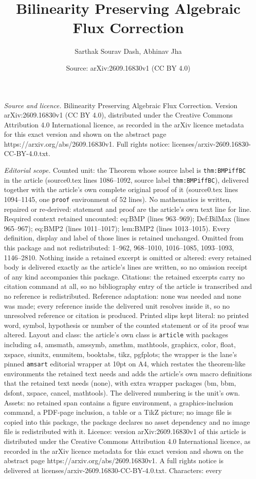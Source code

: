 \documentclass[10pt,a4paper]{amsart}
\title[Bilinearity Preserving Algebraic Flux Correction]{Bilinearity Preserving Algebraic Flux Correction}
\author{Sarthak Sourav Dash, Abhinav Jha}
\date{Source: arXiv:2609.16830v1 (CC BY 4.0)}
\begin{document}
\maketitle

\noindent\emph{Source and licence.} Bilinearity Preserving Algebraic Flux Correction. Version arXiv:2609.16830v1 (CC BY 4.0), distributed under the Creative Commons Attribution 4.0 International licence, as recorded in the arXiv licence metadata for this exact version and shown on the abstract page https://arxiv.org/abs/2609.16830v1. Full rights notice: licenses/arxiv-2609.16830-CC-BY-4.0.txt.\par\smallskip

\noindent\textit{Editorial scope.} Counted unit: the Theorem whose source label is \texttt{thm:BMPiffBC} in the article (source0.tex lines 1086--1092, source label \texttt{thm:BMPiffBC}), delivered together with the article's own complete original proof of it (source0.tex lines 1094--1145, one \texttt{proof} environment of 52 lines). No mathematics is written, repaired or re-derived: statement and proof are the article's own text line for line. Required context retained uncounted: eq:BMP (lines 963--969); Def:BilMax (lines 965--967); eq:BMP2 (lines 1011--1017); lem:BMP2 (lines 1013--1015). Every definition, display and label of those lines is retained unchanged. Omitted from this package and not redistributed: 1--962, 968--1010, 1016--1085, 1093--1093, 1146--2810. Nothing inside a retained excerpt is omitted or altered: every retained body is delivered exactly as the article's lines are written, so no omission receipt of any kind accompanies this package. Citations: the retained excerpts carry no citation command at all, so no bibliography entry of the article is transcribed and no reference is redistributed. Reference adaptation: none was needed and none was made; every reference inside the delivered unit resolves inside it, so no unresolved reference or citation is produced. Printed slips kept literal: no printed word, symbol, hypothesis or number of the counted statement or of its proof was altered. Layout and class: the article's own class is \texttt{article} with packages including a4, amsmath, amssymb, amsthm, mathtools, graphicx, color, float, xspace, siunitx, enumitem, booktabs, tikz, pgfplots; the wrapper is the lane's pinned \texttt{amsart} editorial wrapper at 10pt on A4, which restates the theorem-like environments the retained text needs and adds the article's own macro definitions that the retained text needs (none), with extra wrapper packages (bm, bbm, dsfont, xspace, cancel, mathtools). The delivered numbering is the unit's own. Assets: no retained span contains a figure environment, a graphics-inclusion command, a PDF-page inclusion, a table or a TikZ picture; no image file is copied into this package, the package declares no asset dependency and no image file is redistributed with it. Licence: version arXiv:2609.16830v1 of this article is distributed under the Creative Commons Attribution 4.0 International licence, as recorded in the arXiv licence metadata for this exact version and shown on the abstract page https://arxiv.org/abs/2609.16830v1. A full rights notice is delivered at licenses/arxiv-2609.16830-CC-BY-4.0.txt. Characters: every 
\end{document}
